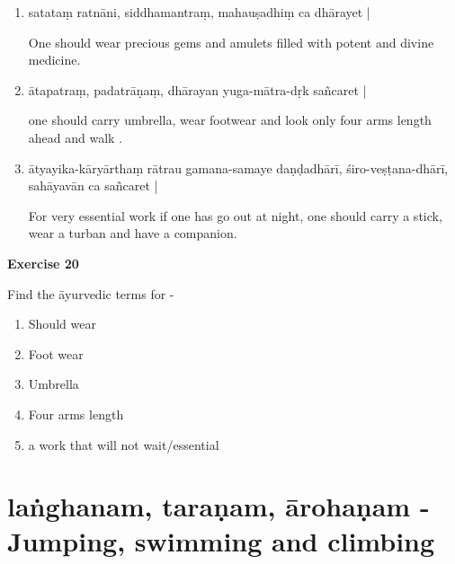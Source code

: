 \begin{enumerate}
\item {}

satataṃ ratnāni, siddhamantraṃ, mahauṣadhiṃ ca dhārayet |

One should wear precious gems and amulets filled with potent and divine medicine. 

\item {}

ātapatraṃ, padatrāṇaṃ, dhārayan yuga-mātra-dṛk sañcaret |

one should carry umbrella, wear footwear and look only four arms length ahead and walk . 

\item {}

ātyayika-kāryārthaṃ rātrau gamana-samaye daṇḍadhārī, śiro-veṣṭana-dhārī, sahāyavān  ca sañcaret |   

For very essential work if one has go out at night, one should carry a stick, wear a turban and  have a companion.
\end{enumerate}

\begin{center}
\textbf{\large Exercise 20}
\end{center}

Find the āyurvedic terms for -
\begin{enumerate}
\renewcommand{\theenumi}{\alph{enumi}}
\renewcommand{\labelenumi}{\theenumi.}
\item Should wear 
\item Foot wear 
\item Umbrella 
\item Four arms length
\item a work that will not wait/essential
\end{enumerate}

\chapter{laṅghanam, taraṇam, ārohaṇam - Jumping, swimming and climbing}

